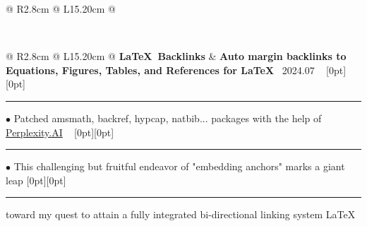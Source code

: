 {{\begin{tabularx}{\linewidth}{@{} R{2.8cm} @{\phantom{d}} L{15.20cm} @{}}
\href{https://github.com/ChenZhu-Xie/NLAST}{\raisebox{-0.05\height}{\color{black!50}\faGithub}} \\ \Gap\Gap\Gap
\end{tabularx}
\\
\begin{tabularx}{\linewidth}{@{} R{2.8cm} @{\phantom{d}} L{15.20cm} @{}}
	\textbf{\LaTeX\ Backlinks} & \hspace{9pt} \textbf{Auto margin backlinks to Equations, Figures, Tables, and References for \LaTeX} \hfill \textendash\ 2024.07 \newline \vspace{2pt} \ \hspace{-3pt} \raisebox{0.09\height}[0pt][0pt]{\vrule width0.5pt height30.0pt} \hspace{-0.30em}\rule[0.25em]{1.0em}{0.5pt}\!\! $\bullet$ {\small Patched amsmath, backref, hypcap, natbib... packages with the help of \href{https://www.perplexity.ai/}{Perplexity.AI}} \newline \vspace{-3pt} \ \hspace{-3pt} \raisebox{0.18\height}[0pt][0pt]{\vrule width0.5pt height14.5pt} \hspace{-0.30em}\rule[0.25em]{1.0em}{0.5pt}\!\! $\bullet$ {\small This challenging but fruitful endeavor of "embedding anchors" marks a giant leap} \newline \vspace{-3pt} \hspace{11.8pt} \raisebox{0.18\height}[0pt][0pt]{\vrule width0.5pt height14.5pt} \hspace{-0.30em}\rule[0.25em]{1.1em}{0.5pt}\!\! \raisebox{0.2\height}{\scriptsize $\blacktriangleright$} {\small toward my quest to attain a fully integrated bi-directional linking system} \hfill {\small \color{color-detail} \LaTeX} \href{https://tex.stackexchange.com/questions/721655/design-a-command-that-allows-a-dual-parameter-command-passing-its-return-into/722065\#722065:~:text=auto\%20backlinks\%20alongside\%20figures\%27\%20captions}{\color{internet_blue!50}\faGlobe} \\ \Gap\Gap\Gap

\end{tabularx}}}
